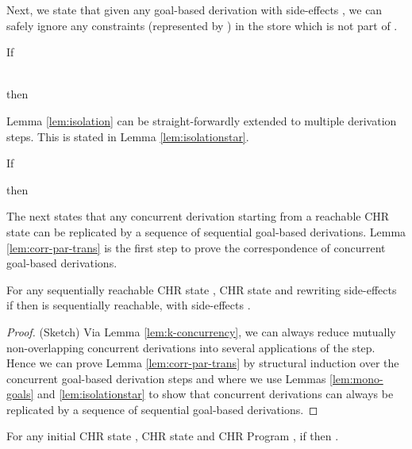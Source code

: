 \documentclass{tlp}
\begin{document}
Next, we state that
given any goal-based derivation with side-effects
, we can safely ignore any constraints (represented by ) in the store
which is not part of . 

\begin{lemma} \label{lem:isolation}
  If
     
\\
  then
     
\end{lemma}

Lemma \ref{lem:isolation} can be straight-forwardly extended to multiple derivation
steps. This is stated in Lemma \ref{lem:isolationstar}.

\begin{lemma} \label{lem:isolationstar}
 If
     
  then
     
\end{lemma}


The next states that any concurrent derivation starting from a reachable CHR state
can be replicated by a sequence of sequential goal-based derivations.
Lemma \ref{lem:corr-par-trans} is the first step to prove the correspondence of
concurrent goal-based derivations.

\begin{lemma}  \label{lem:corr-par-trans}
   For any sequentially reachable CHR state , CHR state  and rewriting
   side-effects  if  then  is 
   sequentially reachable,  with side-effects .
\end{lemma}
\begin{proof}(Sketch)
Via Lemma \ref{lem:k-concurrency}, we can always reduce  mutually non-overlapping concurrent 
derivations into several applications of the  step. Hence we
can prove Lemma \ref{lem:corr-par-trans} by structural induction over the
concurrent goal-based derivation steps  and 
where we use Lemmas \ref{lem:mono-goals} and \ref{lem:isolationstar} to show that
concurrent derivations can always be replicated by a sequence of sequential
goal-based derivations. 
\end{proof}


\begin{theorem}  \label{theo:corr-par-trans}
   For any initial CHR state , CHR state  and CHR Program , 
   if  then .
\end{theorem}
\end{document}
